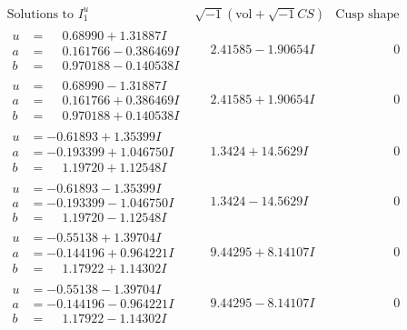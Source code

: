 \documentclass[1p]{elsarticle_modified}
\theoremstyle{definition}
\newcommand{\I}{\sqrt{-1}}
\begin{document}
$$\begin{array}{c|c|c}
 \end{array}$$\newpage$$\begin{array}{c|c|c}  
\text{Solutions to }I^u_{1}& \I (\text{vol} + \sqrt{-1}CS) & \text{Cusp shape}\\
 \hline 
\begin{aligned}
u &= \phantom{-}0.68990 + 1.31887 I \\
a &= \phantom{-}0.161766 - 0.386469 I \\
b &= \phantom{-}0.970188 - 0.140538 I\end{aligned}
 & \phantom{-}2.41585 - 1.90654 I & \phantom{-0.000000 } 0 \\ \hline\begin{aligned}
u &= \phantom{-}0.68990 - 1.31887 I \\
a &= \phantom{-}0.161766 + 0.386469 I \\
b &= \phantom{-}0.970188 + 0.140538 I\end{aligned}
 & \phantom{-}2.41585 + 1.90654 I & \phantom{-0.000000 } 0 \\ \hline\begin{aligned}
u &= -0.61893 + 1.35399 I \\
a &= -0.193399 + 1.046750 I \\
b &= \phantom{-}1.19720 + 1.12548 I\end{aligned}
 & \phantom{-}1.3424 + 14.5629 I & \phantom{-0.000000 } 0 \\ \hline\begin{aligned}
u &= -0.61893 - 1.35399 I \\
a &= -0.193399 - 1.046750 I \\
b &= \phantom{-}1.19720 - 1.12548 I\end{aligned}
 & \phantom{-}1.3424 - 14.5629 I & \phantom{-0.000000 } 0 \\ \hline\begin{aligned}
u &= -0.55138 + 1.39704 I \\
a &= -0.144196 + 0.964221 I \\
b &= \phantom{-}1.17922 + 1.14302 I\end{aligned}
 & \phantom{-}9.44295 + 8.14107 I & \phantom{-0.000000 } 0 \\ \hline\begin{aligned}
u &= -0.55138 - 1.39704 I \\
a &= -0.144196 - 0.964221 I \\
b &= \phantom{-}1.17922 - 1.14302 I\end{aligned}
 & \phantom{-}9.44295 - 8.14107 I & \phantom{-0.000000 } 0 \\ \hline\begin{aligned}

\end{aligned}
\end{array}$$
\end{document}
